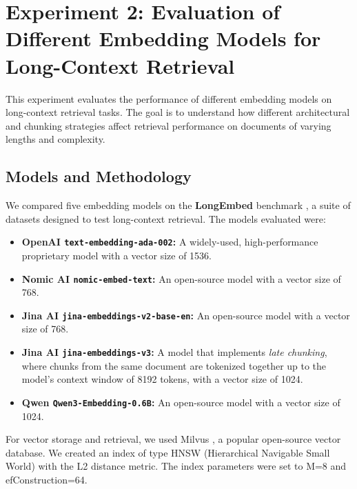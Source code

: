 \section{Experiment 2: Evaluation of Different Embedding Models for Long-Context Retrieval}
\label{sec:exp_embedding_models}
This experiment evaluates the performance of different embedding models on long-context retrieval tasks. The goal is to understand how different architectural and chunking strategies affect retrieval performance on documents of varying lengths and complexity.

\subsection{Models and Methodology}
We compared five embedding models on the \textbf{LongEmbed} benchmark \autocite{zhu2024longembedextendingembeddingmodels}, a suite of datasets designed to test long-context retrieval. The models evaluated were:
\begin{itemize}
    \item \textbf{OpenAI \texttt{text-embedding-ada-002}:} A widely-used, high-performance proprietary model with a vector size of 1536.
    \item \textbf{Nomic AI \texttt{nomic-embed-text}:} An open-source model with a vector size of 768.
    \item \textbf{Jina AI \texttt{jina-embeddings-v2-base-en}:} An open-source model with a vector size of 768.
    \item \textbf{Jina AI \texttt{jina-embeddings-v3}:} A model that implements \textit{late chunking}, where chunks from the same document are tokenized together up to the model's context window of 8192 tokens, with a vector size of 1024.
    \item \textbf{Qwen \texttt{Qwen3-Embedding-0.6B}:} An open-source model with a vector size of 1024.
\end{itemize}
For vector storage and retrieval, we used Milvus \autocite{milvus}, a popular open-source vector database. We created an index of type HNSW (Hierarchical Navigable Small World) with the L2 distance metric. The index parameters were set to M=8 and efConstruction=64.


